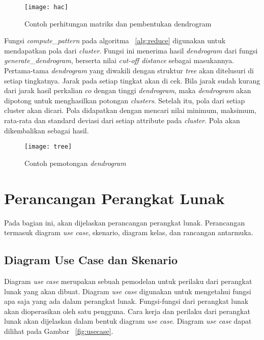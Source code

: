 \begin{figure}[H]
    \centering  
    \texttt{[image: hac]}  
    \caption[Contoh perhitungan matriks dan pembentukan dendrogram]{Contoh perhitungan matriks dan pembentukan dendrogram} 
    \label{fig:hac}
\end{figure}

Fungsi \textit{compute}\_\textit{pattern} pada algoritma ~\ref{alg:reduce} digunakan untuk mendapatkan pola dari \textit{cluster}. Fungsi ini menerima hasil \textit{dendrogram} dari fungsi \textit{generate}\_\textit{dendrogram}, berserta nilai \textit{cut-off distance} sebagai masukannya. Pertama-tama \textit{dendrogram} yang diwakili dengan struktur \textit{tree} akan ditelusuri di setiap tingkatnya. Jarak pada setiap tingkat akan di cek. Bila jarak sudah kurang dari jarak hasil perkalian $co$ dengan tinggi \textit{dendrogram}, maka \textit{dendrogram} akan dipotong untuk menghasilkan potongan \textit{clusters}. Setelah itu, pola dari setiap cluster akan dicari. Pola didapatkan dengan mencari nilai minimum, maksimum, rata-rata dan standard deviasi dari setiap attribute pada \textit{cluster}. Pola akan dikembalikan sebagai hasil.

\begin{figure}[H]
    \centering  
    \texttt{[image: tree]}  
    \caption[Contoh pemotongan \textit{dendrogram}]{Contoh pemotongan \textit{dendrogram}} 
    \label{fig:tree} 
\end{figure}


 

\section{Perancangan Perangkat Lunak}

Pada bagian ini, akan dijelaskan perancangan perangkat lunak.  Perancangan termasuk diagram \textit{use case}, skenario, diagram kelas, dan rancangan antarmuka. 


\subsection{Diagram Use Case dan Skenario}

Diagram \textit{use case} merupakan sebuah pemodelan untuk perilaku dari perangkat lunak yang akan dibuat. Diagram \textit{use case} digunakan untuk mengetahui fungsi apa saja yang ada dalam perangkat lunak. Fungsi-fungsi dari perangkat lunak akan dioperasikan oleh satu pengguna. Cara kerja dan perilaku dari perangkat lunak akan dijelaskan dalam bentuk diagram \textit{use case}. Diagram \textit{use case} dapat dilihat pada Gambar ~\ref{fig:usecase}.


